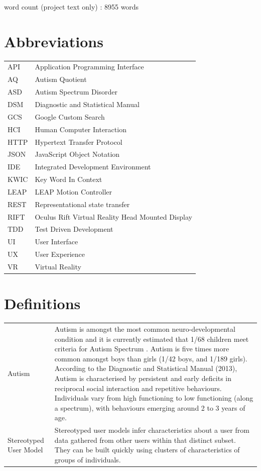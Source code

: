 \documentclass[a4paper, 11pt]{article}
\begin{document}
\begin{center}
word count (project text only) : 8955 words
\end{center}

\clearpage
\tableofcontents
\clearpage

\section*{Abbreviations}
\begin{tabular}{l l }
API & Application Programming Interface\\
AQ & Autism Quotient\\
ASD & Autism Spectrum Disorder\\
DSM & Diagnostic and Statistical Manual\\
GCS & Google Custom Search\\
HCI & Human Computer Interaction\\
HTTP & Hypertext Transfer Protocol\\
JSON & JavaScript Object Notation\\
IDE & Integrated Development Environment\\
KWIC & Key Word In Context\\
LEAP & LEAP Motion Controller\\
REST & Representational state transfer\\
RIFT & Oculus Rift Virtual Reality Head Mounted Display\\
TDD & Test Driven Development\\
UI & User Interface\\
UX & User Experience\\
VR & Virtual Reality\\
\end{tabular}

\section*{Definitions}

\begin{tabular}{l p{11cm}  }
Autism & Autism is amongst the most common neuro-developmental condition and it is currently estimated that 1/68 children meet criteria for Autism Spectrum \cite{CDC}. Autism is five times more common amongst boys than girls (1/42 boys, and 1/189 girls). According to the Diagnostic and Statistical Manual (2013), Autism is characterised by persistent and early deficits in reciprocal social interaction and repetitive behaviours. Individuals vary from high functioning to low functioning (along a spectrum), with behaviours emerging around 2 to 3 years of age.\\


Stereotyped User Model & Stereotyped user models infer characteristics about a user from data gathered from other users within that distinct subset. They can be built quickly using clusters of characteristics of groups of individuals. 

\end{tabular}
\clearpage
\end{document}
